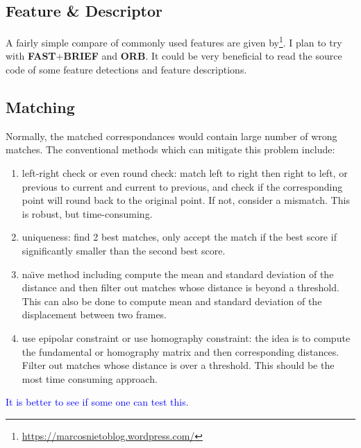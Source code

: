 \subsection{Feature \& Descriptor}
A fairly simple compare of commonly used features are given by\footnote{\url{https://marcosnietoblog.wordpress.com/}}.
I plan to try with \textbf{FAST}+\textbf{BRIEF} and \textbf{ORB}.
It could be very beneficial to read the source code of some feature detections and feature descriptions.

\subsection{Matching}
Normally, the matched correspondances would contain large number of wrong matches. The conventional methods which can mitigate this problem include:
\begin{enumerate}
	\item left-right check or even round check: match left to right then right to left, or previous to current and current to previous, and check if the corresponding point will round back to the original point. If not, consider a mismatch. This is robust, but time-consuming.
	\item uniqueness: find 2 best matches, only accept the match if the best score if significantly smaller than the second best score.
	\item na\"{\i}ve method including compute the mean and standard deviation of the distance and then filter out matches whose distance is beyond a threshold. This can also be done to compute mean and standard deviation of the displacement between two frames.
	\item use epipolar constraint or use homography constraint: the idea is to compute the fundamental or homography matrix and then corresponding distances. Filter out matches whose distance is over a threshold. This should be the most time consuming approach.
\end{enumerate}
\textcolor{blue}{It is better to see if some one can test this}.